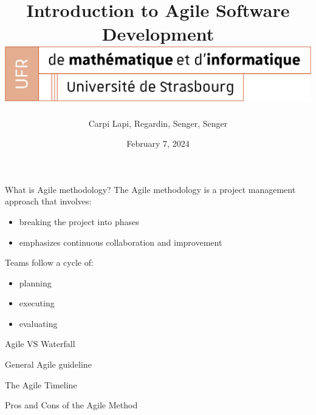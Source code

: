 \documentclass[10pt]{beamer}
\title[Introduction to Agile Software Development]{
  Introduction to Agile Software Development \\
  \vspace{1cm}
  \includegraphics[width=0.6\pdfpagewidth]{logo_Uni.png}
}
\author[SuperAgile]{Carpi Lapi, Regardin, Senger, Senger}
\date[February 7, 2024]{February 7, 2024}
\begin{document}
\frame{\titlepage}

\begin{frame}{What is Agile methodology?}
The Agile methodology is a project management approach that involves:
\begin{itemize}
    \item breaking the project into phases
    \item emphasizes continuous collaboration and improvement \\
    \vspace{1cm}
\end{itemize}

Teams follow a cycle of: 
\begin{itemize}
    \item planning
    \item executing
    \item evaluating
\end{itemize}

\end{frame}

\begin{frame}{Agile VS Waterfall}
    
\end{frame}

\begin{frame}{General Agile guideline}
    
\end{frame}

\begin{frame}{The Agile Timeline}
  
\end{frame}

\begin{frame}{Pros and Cons of the Agile Method}
  
\end{frame}
\end{document}
